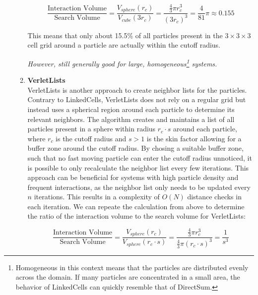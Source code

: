 \begin{enumerate}[label=\textbf{\arabic*.}]
\begin{enumerate}
                        \begin{equation}
                              \frac{\text{Interaction Volume}}{\text{Search Volume}} =
                              \frac{V_{sphere}(r_c)}{V_{cube}(3r_c)} = \frac{\frac{4}{3}\pi r_c^3}{(3r_c)^3} = \frac{4}{81}\pi \approx 0.155
                        \end{equation}

                        This means that only about 15.5\% of all particles present in the $3\times3\times3$ cell grid around a particle are actually within the cutoff radius.

                        \textit{However, still generally good for large, homogeneous\footnote{Homogeneous in this context means that the particles are distributed evenly across the domain. If many particles are concentrated in a small area, the behavior of LinkedCells can quickly resemble that of DirectSum.} systems.}

                  \item \textbf{VerletLists} \\
                        VerletLists is another approach to create neighbor lists for the particles. Contrary to LinkedCells, VerletLists does not rely on a regular grid but instead uses a spherical region around each particle to determine its relevant neighbors.
                        The algorithm creates and maintains a list of all particles present in a sphere within radius $r_c \cdot s$ around each particle, where $r_c$ is the cutoff radius and $s>1$ is the skin factor allowing for a buffer zone around the cutoff radius.
                        By chosing a suitable buffer zone, such that no fast moving particle can enter the cutoff radius unnoticed, it is possible to only recalculate the neighbor list every few iterations. This approach can be beneficial for systems with high particle density and frequent interactions, as the neighbor list only needs to be updated every $n$ iterations. This results in a complexity of $O(N)$ distance checks in each iteration.
                        We can repeate the calculation from above to determine the ratio of the interaction volume to the search volume for VerletLists:

                        \begin{equation}
                              \frac{\text{Interaction Volume}}{\text{Search Volume}} =
                              \frac{V_{sphere}(r_c)}{V_{sphere}(r_c \cdot s)} = \frac{\frac{4}{3}\pi r_c^3}{\frac{4}{3}\pi (r_c \cdot s)^3} = \frac{1}{s^3}
                        \end{equation}


\end{enumerate}
\end{enumerate}
